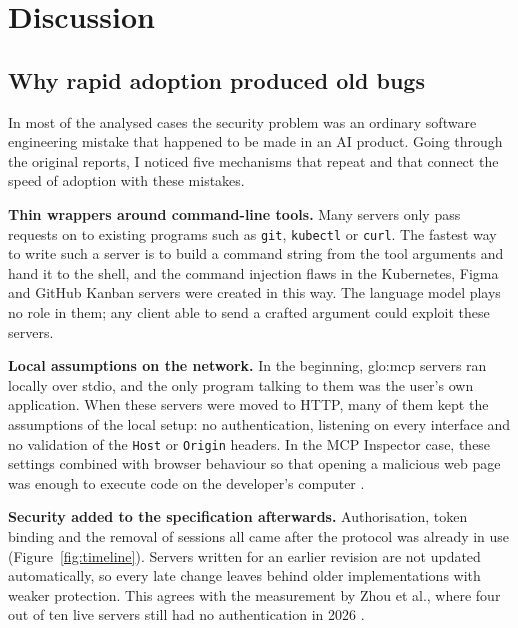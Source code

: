 \chapter{Discussion}

\section{Why rapid adoption produced old bugs}

\par In most of the analysed cases the security problem was an ordinary software engineering mistake that happened to be made in an AI product. Going through the original reports, I noticed five mechanisms that repeat and that connect the speed of adoption with these mistakes.

\par \textbf{Thin wrappers around command-line tools.} Many servers only pass requests on to existing programs such as \texttt{git}, \texttt{kubectl} or \texttt{curl}. The fastest way to write such a server is to build a command string from the tool arguments and hand it to the shell, and the command injection flaws in the Kubernetes, Figma and GitHub Kanban servers were created in this way. The language model plays no role in them; any client able to send a crafted argument could exploit these servers.

\par \textbf{Local assumptions on the network.} In the beginning, \acrshort{glo:mcp} servers ran locally over stdio, and the only program talking to them was the user's own application. When these servers were moved to HTTP, many of them kept the assumptions of the local setup: no authentication, listening on every interface and no validation of the \texttt{Host} or \texttt{Origin} headers. In the MCP Inspector case, these settings combined with browser behaviour so that opening a malicious web page was enough to execute code on the developer's computer \cite{oligo2025}.

\par \textbf{Security added to the specification afterwards.} Authorisation, token binding and the removal of sessions all came after the protocol was already in use (Figure~\ref{fig:timeline}). Servers written for an earlier revision are not updated automatically, so every late change leaves behind older implementations with weaker protection. This agrees with the measurement by Zhou et al., where four out of ten live servers still had no authentication in 2026 \cite{zhou2026}.

